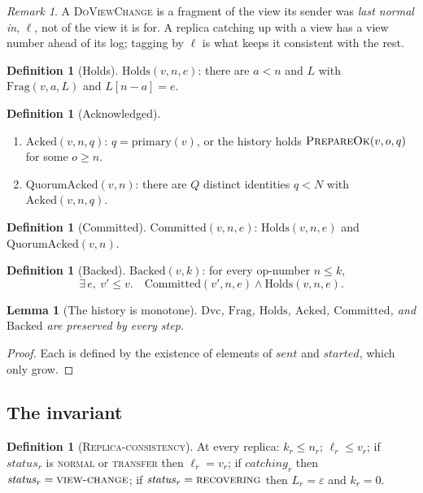 \documentclass[11pt,a4paper]{article}
\theoremstyle{plain}
\newtheorem{lemma}[theorem]{Lemma}
\theoremstyle{definition}
\newtheorem{definition}[theorem]{Definition}
\theoremstyle{remark}
\newtheorem{remark}[theorem]{Remark}
\newcommand{\msg}[1]{\textsc{#1}}
\newcommand{\dvc}{\msg{DoViewChange}}
\newcommand{\Frag}{\mathrm{Frag}}
\newcommand{\Holds}{\mathrm{Holds}}
\newcommand{\Acked}{\mathrm{Acked}}
\newcommand{\QuorumAcked}{\mathrm{QuorumAcked}}
\newcommand{\Committed}{\mathrm{Committed}}
\newcommand{\Backed}{\mathrm{Backed}}
\newcommand{\primary}{\mathrm{primary}}
\newcommand{\sent}{\mathit{sent}}
\newcommand{\started}{\mathit{started}}
\newcommand{\status}{\mathit{status}}
\newcommand{\normal}{\textsc{normal}}
\newcommand{\viewchange}{\textsc{view-change}}
\newcommand{\transfer}{\textsc{transfer}}
\newcommand{\recovering}{\textsc{recovering}}
\newcommand{\Local}{\textsc{Replica-consistency}}
\begin{document}
\begin{remark}
A \dvc{} is a fragment of the view its sender was \emph{last normal
in}, $\ell$, not of the view it is for. A replica catching up with a view
has a view number ahead of its log; tagging by $\ell$ is what keeps it
consistent with the rest.
\end{remark}

\begin{definition}[Holds]
$\Holds(v, n, e)$: there are $a < n$ and $L$ with $\Frag(v, a, L)$ and
$L[n - a] = e$.
\end{definition}

\begin{definition}[Acknowledged]
\leavevmode
\begin{enumerate}[nosep,label=(\roman*)]
  \item $\Acked(v, n, q)$: $q = \primary(v)$, or the history holds
    $\msg{PrepareOk}(v, o, q)$ for some $o \ge n$.
  \item $\QuorumAcked(v, n)$: there are $Q$ distinct identities $q < N$
    with $\Acked(v, n, q)$.
\end{enumerate}
\end{definition}

\begin{definition}[Committed]
$\Committed(v, n, e)$: $\Holds(v, n, e)$ and $\QuorumAcked(v, n)$.
\end{definition}

\begin{definition}[Backed]
$\Backed(v, k)$: for every op-number $n \le k$,
\[
\exists\, e,\ v' \le v.\quad \Committed(v', n, e) \wedge \Holds(v, n, e).
\]
\end{definition}

\begin{lemma}[The history is monotone]
\label{lem:mono}
$\mathrm{Dvc}$, $\Frag$, $\Holds$, $\Acked$, $\Committed$, and $\Backed$
are preserved by every step.
\end{lemma}
\begin{proof}
Each is defined by the existence of elements of $\sent$ and $\started$,
which only grow.
\end{proof}

\subsection{The invariant}
\label{sec:invariant}

\begin{definition}[\Local]
\label{def:local}
At every replica: $k_r \le n_r$; $\ell_r \le v_r$; if $\status_r$ is
\normal{} or \transfer{} then $\ell_r = v_r$; if $\mathit{catching}_r$
then $\status_r = \viewchange$; if $\status_r = \recovering$ then
$L_r = \varepsilon$ and $k_r = 0$.
\end{definition}
\end{document}
